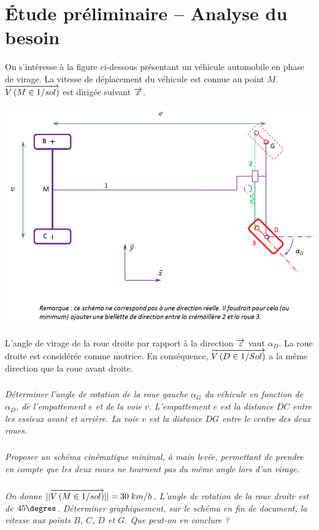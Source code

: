 \documentclass[10pt]{article}
\newif\ifxp
\begin{document}
\ifxp

\else

\fi


\section{Étude préliminaire -- Analyse du besoin}

On s'intéresse à la figure ci-dessous présentant un véhicule automobile en phase de virage. La vitesse de déplacement du véhicule est connue au point $M$. $\overrightarrow{V\left( {M} \in {1}/{sol}\right)}$ est dirigée suivant $\overrightarrow{x}$.


\begin{center}
\includegraphics[width=.9\textwidth]{images/voiture}
\end{center}

L'angle de virage de la roue droite par rapport à la direction $\overrightarrow{z}$ vaut $\alpha_D$. La roue droite est considérée comme motrice. En conséquence, $\overrightarrow{V\left( {D} \in {1}/{Sol}\right)}$ a la même direction que la roue avant droite. 

\subparagraph{}
\textit{Déterminer l'angle de rotation de la roue gauche $\alpha_G$ du véhicule en fonction de $\alpha_D$, de l'empattement $e$ et de la voie $v$. L'empattement $e$ est la distance $DC$ entre les essieux avant et arrière. La voie $v$ est la distance $DG$ entre le centre des deux roues.}



\subparagraph{}
\textit{Proposer un schéma cinématique minimal, à main levée, permettant de prendre en compte que les deux roues ne tournent pas du même angle lors d'un virage. }


\subparagraph{}
\textit{On donne $||\overrightarrow{V\left( {M} \in {1}/{sol}\right)}||=30\; km/h$. L'angle de rotation de la roue droite est de $45\degres$. Déterminer graphiquement, sur le schéma en fin de document, la vitesse aux points $B$, $C$, $D$ et $G$. Que peut-on en conclure ?}
\end{document}

